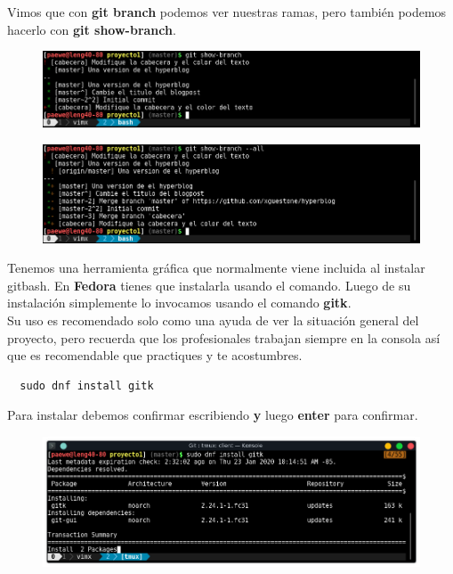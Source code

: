 \documentclass{article}
\begin{document}
Vimos que con \textbf{git branch} podemos ver nuestras ramas, pero también
podemos hacerlo con \textbf{git show-branch}.

\begin{figure}[h!]
  \centering
  \includegraphics[scale=0.75]{./Pictures/247_show_branch.png}
\end{figure}

\begin{figure}[h!]
  \centering
  \includegraphics[scale=0.75]{./Pictures/248_show_branch_all.png}
\end{figure}

Tenemos una herramienta gráfica que normalmente viene incluida al instalar
gitbash. En \textbf{Fedora} tienes que instalarla usando el comando. Luego de
su instalación simplemente lo invocamos usando el comando \textbf{gitk}.\\

Su uso es recomendado solo como una ayuda de ver la situación general del
proyecto, pero recuerda que los profesionales trabajan siempre en la consola
así que es recomendable que practiques y te acostumbres.

\begin{verbatim}
  sudo dnf install gitk
\end{verbatim}

Para instalar debemos confirmar escribiendo \textbf{y} luego \textbf{enter}
para confirmar.

\begin{figure}[h!]
  \centering
  \includegraphics[scale=0.75]{./Pictures/256_gitk_install.png}
\end{figure}
\end{document}
